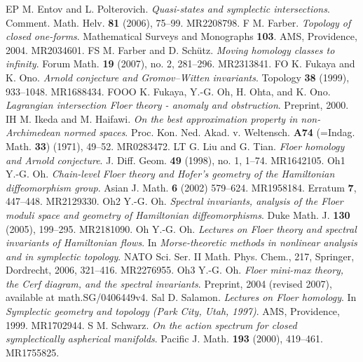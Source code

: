 \documentclass{amsart}
\theoremstyle{plain}
\theoremstyle{definition}
\theoremstyle{remark}
\begin{document}
\begin{thebibliography}{99}
\bibitem
{EP} M. Entov and L. Polterovich. \emph{Quasi-states and symplectic intersections}. Comment. Math. Helv. \textbf{81} (2006), 75--99. MR2208798.
\bibitem
{F} M. Farber. \emph{Topology of closed one-forms}.  Mathematical Surveys and Monographs \textbf{103}. AMS, Providence, 2004. MR2034601.
\bibitem
{FS} M. Farber and D. Sch\"utz. \emph{Moving homology classes to infinity}. Forum Math. \textbf{19} (2007), no. 2, 281--296. MR2313841.
\bibitem
{FO} K. Fukaya and K. Ono. \emph{Arnold conjecture and Gromov--Witten invariants}.  Topology \textbf{38} (1999), 933--1048. MR1688434.
\bibitem
{FOOO} K. Fukaya, Y.-G. Oh, H. Ohta, and K. Ono.  \emph{Lagrangian intersection Floer theory - anomaly and obstruction}. Preprint, 2000.
\bibitem
{IH} M. Ikeda and M. Haifawi. \emph{On the best approximation property in non-Archimedean normed spaces}. Proc. Kon. Ned. Akad. v. Weltensch.  \textbf{A74} (=Indag. Math. \textbf{33}) (1971), 49--52. MR0283472.
\bibitem
{LT} G. Liu and G. Tian. \emph{Floer homology and Arnold
conjecture}. J. Diff. Geom. \textbf{49} (1998), no. 1, 1--74. MR1642105.
\bibitem
{Oh1} Y.-G. Oh. \emph{Chain-level Floer theory and Hofer's geometry of the Hamiltonian diffeomorphism group}. Asian J. Math. \textbf{6} (2002) 579--624.  MR1958184. Erratum \textbf{7}, 447--448. MR2129330.
\bibitem
{Oh2} Y.-G. Oh. \emph{Spectral invariants, analysis of the Floer moduli space and geometry of Hamiltonian diffeomorphisms}. Duke Math. J. \textbf{130} (2005), 199--295. MR2181090.
\bibitem
{Oh} Y.-G. Oh. \emph{Lectures on Floer theory and spectral invariants of Hamiltonian flows}. In \emph{Morse-theoretic methods in nonlinear analysis and in symplectic topology}. NATO Sci. Ser. II Math. Phys. Chem., 217, Springer, Dordrecht, 2006, 321--416.  MR2276955.
\bibitem
{Oh3} Y.-G. Oh. \emph{Floer mini-max theory, the Cerf diagram, and the spectral invariants}. Preprint, 2004 (revised 2007), available at math.SG/0406449v4.
\bibitem
{Sal} D. Salamon. \emph{Lectures on Floer homology}. In
\emph{Symplectic geometry and topology (Park City, Utah, 1997)}.
AMS, Providence, 1999. MR1702944.
\bibitem
{S} M. Schwarz. \emph{On the action spectrum for closed symplectically aspherical manifolds}. Pacific J. Math. \textbf{193} (2000), 419--461. MR1755825.
\end{thebibliography}
\end{document}
